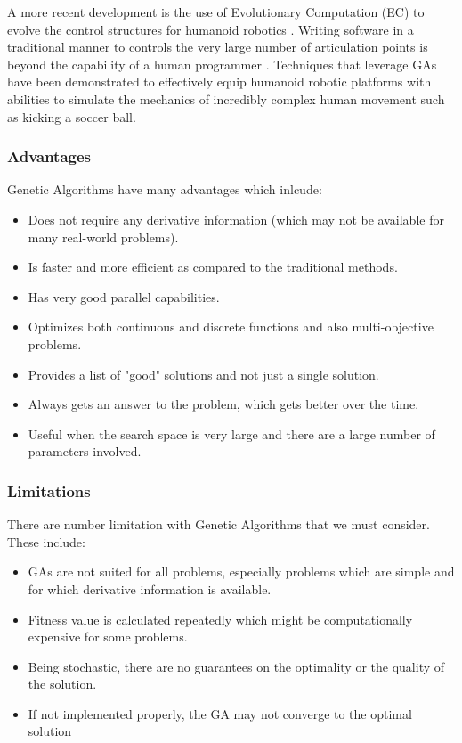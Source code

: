 A more recent development is the use of Evolutionary Computation (EC) to evolve the control structures for humanoid robotics \citep{eaton2015}. Writing software in a traditional manner to controls the very large number of articulation points is beyond the capability of a human programmer \citep{eaton2015}. Techniques that leverage GAs have been demonstrated to effectively equip humanoid robotic platforms with abilities to simulate the mechanics of incredibly complex human movement such as kicking a soccer ball.

\subsubsection{Advantages}
Genetic Algorithms have many advantages which inlcude:
\begin{itemize}
\item Does not require any derivative information (which may not be available for many real-world problems).
\item Is faster and more efficient as compared to the traditional methods.
\item Has very good parallel capabilities.
\item Optimizes both continuous and discrete functions and also multi-objective problems.
\item Provides a list of "good" solutions and not just a single solution.
\item Always gets an answer to the problem, which gets better over the time.
\item Useful when the search space is very large and there are a large number of parameters involved.
\end{itemize}

\subsubsection{Limitations}
There are number limitation with Genetic Algorithms that we must consider. These include:
\begin{itemize}
\item GAs are not suited for all problems, especially problems which are simple and for which derivative information is available.

\item Fitness value is calculated repeatedly which might be computationally expensive for some problems.

\item Being stochastic, there are no guarantees on the optimality or the quality of the solution.

\item If not implemented properly, the GA may not converge to the optimal solution
\end{itemize}

\citep{pit:95}

